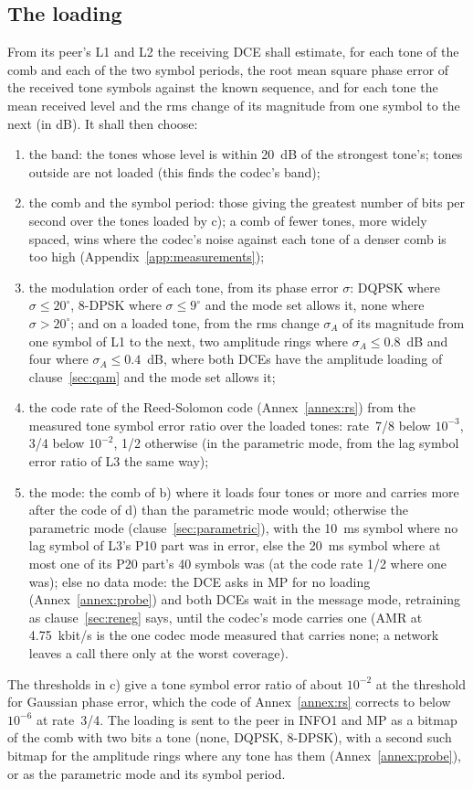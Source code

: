 \documentclass[a4paper,11pt]{article}
\newcounter{annex}
\newcommand{\kbs}{kbit/s}
\begin{document}
\subsection{The loading}\label{sec:loading}
From its peer's L1 and L2 the receiving DCE shall estimate, for each tone
of the comb and each of the two symbol periods, the root mean square
phase error of the received tone symbols against the known sequence, and
for each tone the mean received level and the rms change of its
magnitude from one symbol to the next (in dB).  It shall then choose:
\begin{enumerate}[label=\alph*)]
\item the band: the tones whose level is within 20~dB of the strongest
  tone's; tones outside are not loaded (this finds the codec's band);
\item the comb and the symbol period: those giving the greatest number
  of bits per second over the tones loaded by c); a comb of fewer tones,
  more widely spaced, wins where the codec's noise against each tone of a
  denser comb is too high (Appendix~\ref{app:measurements});
\item the modulation order of each tone, from its phase error $\sigma$:
  DQPSK where $\sigma \le 20^\circ$, 8-DPSK where $\sigma \le 9^\circ$ and
  the mode set allows it, none where $\sigma > 20^\circ$; and on a loaded
  tone, from the rms change $\sigma_A$ of its magnitude from one symbol of
  L1 to the next, two amplitude rings where $\sigma_A \le 0.8$~dB and four
  where $\sigma_A \le 0.4$~dB, where both DCEs have the amplitude loading
  of clause~\ref{sec:qam} and the mode set allows it;
\item the code rate of the Reed-Solomon code (Annex~\ref{annex:rs}) from
  the measured tone symbol error ratio over the loaded tones: rate~7/8
  below $10^{-3}$, 3/4 below $10^{-2}$, 1/2 otherwise (in the parametric
  mode, from the lag symbol error ratio of L3 the same way);
\item the mode: the comb of b) where it loads four tones or more and
  carries more after the code of d) than the parametric mode would;
  otherwise the parametric mode (clause~\ref{sec:parametric}), with the
  10~ms symbol where no lag symbol of L3's P10 part was in error, else
  the 20~ms symbol where at most one of its P20 part's 40 symbols was (at
  the code rate 1/2 where one was); else no data mode:
  the DCE asks in MP for no loading (Annex~\ref{annex:probe}) and both
  DCEs wait in the message mode, retraining as clause~\ref{sec:reneg}
  says, until the codec's mode carries one (AMR at 4.75~\kbs{} is the
  one codec mode measured that carries none; a network leaves a call
  there only at the worst coverage).
\end{enumerate}
The thresholds in c) give a tone symbol error ratio of about $10^{-2}$
at the threshold for Gaussian phase error, which the code of
Annex~\ref{annex:rs} corrects to below $10^{-6}$ at rate~3/4.  The
loading is sent to the peer in INFO1 and MP as a bitmap of the comb with
two bits a tone (none, DQPSK, 8-DPSK), with a second such bitmap for the
amplitude rings where any tone has them (Annex~\ref{annex:probe}), or as
the parametric mode and its symbol period.
\end{document}
